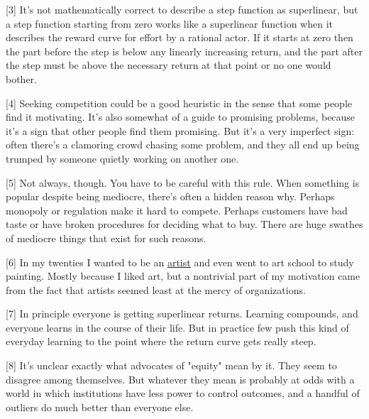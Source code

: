 [3] It's not mathematically correct to describe a step function
                  as superlinear, but a step function starting from zero works
                  like a superlinear function when it describes the reward curve
                  for effort by a rational actor. If it starts at zero then the
                  part before the step is below any linearly increasing return,
                  and the part after the step must be above the necessary return
                  at that point or no one would bother.

[4] Seeking competition could be a good heuristic in the sense
                  that some people find it motivating. It's also somewhat of a
                  guide to promising problems, because it's a sign that other
                  people find them promising. But it's a very imperfect sign:
                  often there's a clamoring crowd chasing some problem, and they
                  all end up being trumped by someone quietly working on another
                  one.

[5] Not always, though. You have to be careful with this rule.
                  When something is popular despite being mediocre, there's
                  often a hidden reason why. Perhaps monopoly or regulation make
                  it hard to compete. Perhaps customers have bad taste or have
                  broken procedures for deciding what to buy. There are huge
                  swathes of mediocre things that exist for such reasons.

[6] In my twenties I wanted to be an
                  \href{http://www.paulgraham.com/worked.html}{\underline{artist}} and even went to art
                  school to study painting. Mostly because I liked art, but a
                  nontrivial part of my motivation came from the fact that
                  artists seemed least at the mercy of organizations.

[7] In principle everyone is getting superlinear returns.
                  Learning compounds, and everyone learns in the course of their
                  life. But in practice few push this kind of everyday learning
                  to the point where the return curve gets really steep.

[8] It's unclear exactly what advocates of "equity" mean by it.
                  They seem to disagree among themselves. But whatever they mean
                  is probably at odds with a world in which institutions have
                  less power to control outcomes, and a handful of outliers do
                  much better than everyone else.

